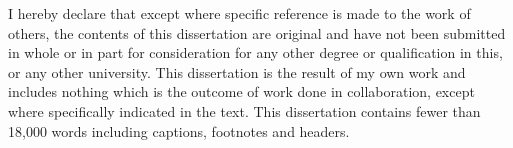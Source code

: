
\begin{declaration}

I hereby declare that except where specific reference is made to the
work of others, the contents of this dissertation are original and
have not been submitted in whole or in part for consideration for any
other degree or qualification in this, or any other university. This
dissertation is the result of my own work and includes nothing which
is the outcome of work done in collaboration, except where
specifically indicated in the text. This dissertation contains fewer
than 18,000 words including captions, footnotes and headers.


\end{declaration}

